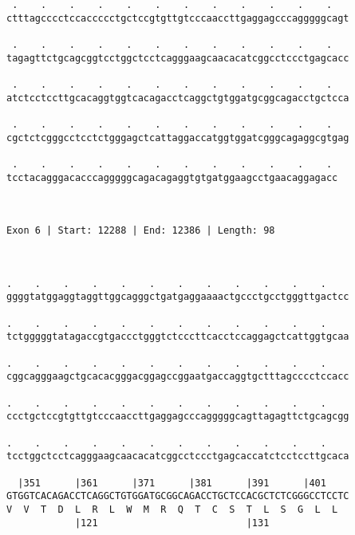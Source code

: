 \documentclass{article}
\begin{document}
\begin{Verbatim}
 .    .    .    .    .    .    .    .    .    .    .    .   
ctttagcccctccaccccctgctccgtgttgtcccaaccttgaggagcccagggggcagt
                                                            
 .    .    .    .    .    .    .    .    .    .    .    .   
tagagttctgcagcggtcctggctcctcagggaagcaacacatcggcctccctgagcacc
                                                            
 .    .    .    .    .    .    .    .    .    .    .    .   
atctcctccttgcacaggtggtcacagacctcaggctgtggatgcggcagacctgctcca
                                                            
 .    .    .    .    .    .    .    .    .    .    .    .   
cgctctcgggcctcctctgggagctcattaggaccatggtggatcgggcagaggcgtgag
                                                            
 .    .    .    .    .    .    .    .    .    .    .    . 
tcctacagggacacccagggggcagacagaggtgtgatggaagcctgaacaggagacc
                                                          
                                                          
 
Exon 6 | Start: 12288 | End: 12386 | Length: 98



.    .    .    .    .    .    .    .    .    .    .    .    
ggggtatggaggtaggttggcagggctgatgaggaaaactgccctgcctgggttgactcc
                                                            
.    .    .    .    .    .    .    .    .    .    .    .    
tctgggggtatagaccgtgaccctgggtctcccttcacctccaggagctcattggtgcaa
                                                            
.    .    .    .    .    .    .    .    .    .    .    .    
cggcagggaagctgcacacgggacggagccggaatgaccaggtgctttagcccctccacc
                                                            
.    .    .    .    .    .    .    .    .    .    .    .    
ccctgctccgtgttgtcccaaccttgaggagcccagggggcagttagagttctgcagcgg
                                                            
.    .    .    .    .    .    .    .    .    .    .    .    
tcctggctcctcagggaagcaacacatcggcctccctgagcaccatctcctccttgcaca
                                                            
  |351      |361      |371      |381      |391      |401    
GTGGTCACAGACCTCAGGCTGTGGATGCGGCAGACCTGCTCCACGCTCTCGGGCCTCCTC
V  V  T  D  L  R  L  W  M  R  Q  T  C  S  T  L  S  G  L  L  
            |121                          |131              
  

\end{Verbatim}
\end{document}
